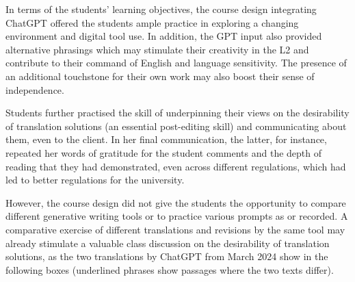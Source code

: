 \documentclass[output=paper]{langscibook}
\begin{document}
In terms of the students’ learning objectives, the course design integrating ChatGPT offered the students ample practice in exploring a changing environment and digital tool use. In addition, the GPT input also provided alternative phrasings which may stimulate their creativity in the L2 and contribute to their command of English and language sensitivity. The presence of an additional touchstone for their own work may also boost their sense of independence.

Students further practised the skill of underpinning their views on the desirability of translation solutions (an essential post-editing skill) and communicating about them, even to the client. In her final communication, the latter, for instance, repeated her words of gratitude for the student comments and the depth of reading that they had demonstrated, even across different regulations, which had led to better regulations for the university.

However, the course design did not give the students the opportunity to compare different generative writing tools or to practice various prompts as \citet{vidakovic2023} or \citet{giampieri24} recorded. A comparative exercise of different translations and revisions by the same tool may already stimulate a valuable class discussion on the desirability of translation solutions, as the two translations by ChatGPT from March 2024 show in the following boxes (underlined phrases show passages where the two texts differ).

  
 
\end{document}
